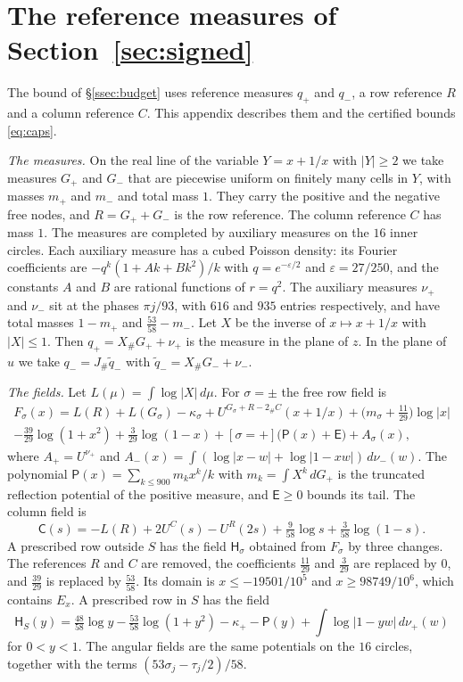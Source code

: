 \section{The reference measures of Section~\ref{sec:signed}}\label{app:trials}

The bound of \S\ref{ssec:budget} uses reference measures $q_+$ and $q_-$, a row reference $R$ and a column reference $C$.
This appendix describes them and the certified bounds \eqref{eq:caps}.

\emph{The measures.} On the real line of the variable $Y=x+1/x$ with $|Y|\ge2$ we take measures $G_+$ and $G_-$ that
are piecewise uniform on finitely many cells in $Y$, with masses $m_+$ and $m_-$ and total mass $1$. They carry the positive and the
negative free nodes, and $R=G_++G_-$ is the row reference. The column reference $C$ has mass $1$. The measures are completed by
auxiliary measures on the $16$ inner circles. Each auxiliary measure has a cubed Poisson density: its Fourier coefficients
are $-q^k(1+Ak+Bk^2)/k$ with $q=e^{-\varepsilon/2}$ and $\varepsilon=27/250$, and the constants $A$ and $B$ are rational functions of $r=q^2$.
The auxiliary measures $\nu_+$ and $\nu_-$ sit at the phases $\pi j/93$, with $616$ and $935$ entries respectively, and have total masses $1-m_+$ and $\frac{53}{58}-m_-$. Let $X$ be the inverse of $x\mapsto x+1/x$ with $|X|\le1$. Then
$q_+=X_\#G_++\nu_+$ is the measure in the plane of $z$. In the plane of $u$ we take $q_-=J_\#\tilde q_-$ with $\tilde q_-=X_\#G_-+\nu_-$.

\emph{The fields.} Let $L(\mu)=\int\log|X|\,d\mu$. For $\sigma=\pm$ the free row field is
\begin{multline*}
 F_\sigma(x)=L(R)+L(G_\sigma)-\kappa_\sigma+U^{G_\sigma+R-2_\#C}(x+1/x)+\bigl(m_\sigma+\tfrac{11}{29}\bigr)\log|x|\\
 -\tfrac{39}{29}\log(1+x^2)+\tfrac3{29}\log(1-x)+[\sigma=+]\bigl(\mathsf P(x)+\mathsf E\bigr)+A_\sigma(x),
\end{multline*}
where $A_+=U^{\nu_+}$ and $A_-(x)=\int(\log|x-w|+\log|1-xw|)\,d\nu_-(w)$. The polynomial $\mathsf P(x)=\sum_{k\le900}m_kx^k/k$ with $m_k=\int X^k\,dG_+$ is
the truncated reflection potential of the positive measure, and $\mathsf E\ge0$ bounds its tail.
The column field is
\[
 \mathsf C(s)=-L(R)+2U^C(s)-U^R(2s)+\tfrac9{58}\log s+\tfrac3{58}\log(1-s).
\]
A prescribed row outside $S$ has the field $\mathsf H_\sigma$ obtained from $F_\sigma$ by three changes. The references $R$ and $C$ are removed, the
coefficients $\frac{11}{29}$ and $\frac3{29}$ are replaced by $0$, and $\frac{39}{29}$ is replaced by $\frac{53}{58}$. Its domain is
$x\le-19501/10^5$ and $x\ge98749/10^6$, which contains $E_x$. A prescribed row in $S$ has the field
\[
 \mathsf H_S(y)=\tfrac{48}{58}\log y-\tfrac{53}{58}\log(1+y^2)-\kappa_+-\mathsf P(y)+\int\log|1-yw|\,d\nu_+(w)
\]
for $0<y<1$.
The angular fields are the same potentials on the $16$ circles, together with the terms $(53\sigma_j-\tau_j/2)/58$.

